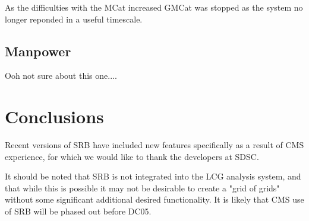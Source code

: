 \documentclass{cmspaper}
\begin{document}
As the difficulties with the MCat increased GMCat was stopped as the system 
no longer reponded in a useful timescale.

\subsection{Manpower}
Ooh not sure about this one....

\section{Conclusions}
Recent versions of SRB have included new features specifically as a 
result of CMS experience, for which we would like to thank the developers
at SDSC.

It should be noted that SRB is not integrated into the LCG analysis
system, and that while this is possible %
it may not be desirable to create a "grid of grids" without some
significant additional desired functionality.  It is likely that CMS
use of SRB will be phased out before DC05.
\end{document}
